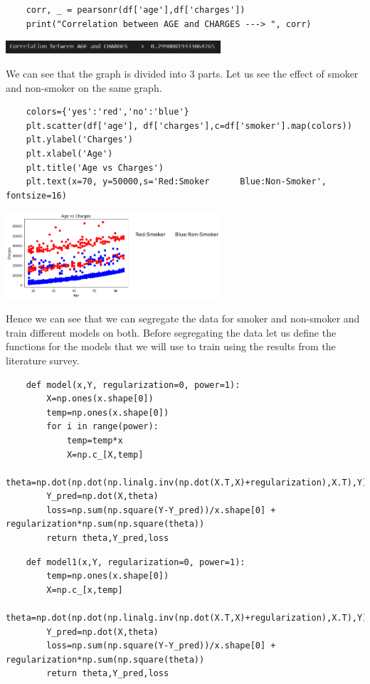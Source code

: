 \documentclass[12pt]{article}
\numberwithin{equation}{section}
\begin{document}
{\begin{center}
\end{center}
\begin{lstlisting}
	corr, _ = pearsonr(df['age'],df['charges'])
	print("Correlation between AGE and CHARGES ---> ", corr)
\end{lstlisting}
\begin{center}
\includegraphics[width=8cm]{work3}
\end{center}
We can see that the graph is divided into 3 parts. Let us see the effect of smoker and non-smoker on the same graph.
\begin{lstlisting}
	colors={'yes':'red','no':'blue'}
	plt.scatter(df['age'], df['charges'],c=df['smoker'].map(colors))
	plt.ylabel('Charges')
	plt.xlabel('Age')
	plt.title('Age vs Charges')
	plt.text(x=70, y=50000,s='Red:Smoker      Blue:Non-Smoker', fontsize=16)
\end{lstlisting}
\begin{center}
\includegraphics[width=8cm]{work4}
\end{center}
Hence we can see that we can segregate the data for smoker and non-smoker and train different models on both. Before segregating the data let us define the functions for the models that we will use to train using the results from the literature survey.
\begin{lstlisting}
	def model(x,Y, regularization=0, power=1):
		X=np.ones(x.shape[0])
		temp=np.ones(x.shape[0])
		for i in range(power):
			temp=temp*x
			X=np.c_[X,temp]
		theta=np.dot(np.dot(np.linalg.inv(np.dot(X.T,X)+regularization),X.T),Y)
		Y_pred=np.dot(X,theta)
		loss=np.sum(np.square(Y-Y_pred))/x.shape[0] + regularization*np.sum(np.square(theta))
		return theta,Y_pred,loss
\end{lstlisting}
\begin{lstlisting}
	def model1(x,Y, regularization=0, power=1):
		temp=np.ones(x.shape[0])
		X=np.c_[x,temp]
		theta=np.dot(np.dot(np.linalg.inv(np.dot(X.T,X)+regularization),X.T),Y)
		Y_pred=np.dot(X,theta)
		loss=np.sum(np.square(Y-Y_pred))/x.shape[0] + regularization*np.sum(np.square(theta))
		return theta,Y_pred,loss

\end{lstlisting}}
\end{document}
